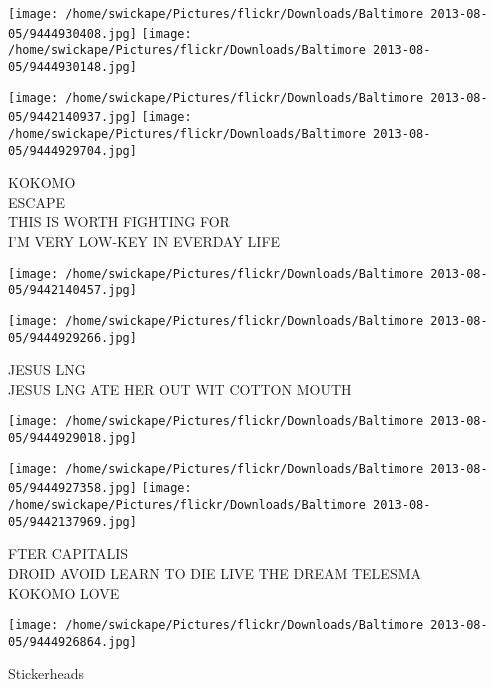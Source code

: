 \documentclass[10pt,letterpaper]{article}
\begin{document}
\texttt{[image: /home/swickape/Pictures/flickr/Downloads/Baltimore 2013-08-05/9444930408.jpg]}
\texttt{[image: /home/swickape/Pictures/flickr/Downloads/Baltimore 2013-08-05/9444930148.jpg]}

\texttt{[image: /home/swickape/Pictures/flickr/Downloads/Baltimore 2013-08-05/9442140937.jpg]}
\texttt{[image: /home/swickape/Pictures/flickr/Downloads/Baltimore 2013-08-05/9444929704.jpg]}

KOKOMO\\
ESCAPE\\
THIS IS WORTH FIGHTING FOR\\
I'M VERY LOW{-}KEY IN EVERDAY LIFE\\
\pagebreak

\texttt{[image: /home/swickape/Pictures/flickr/Downloads/Baltimore 2013-08-05/9442140457.jpg]}

\vspace{0.25in}
\texttt{[image: /home/swickape/Pictures/flickr/Downloads/Baltimore 2013-08-05/9444929266.jpg]}

JESUS LNG\\
JESUS LNG ATE HER OUT WIT COTTON MOUTH\\
\pagebreak

\texttt{[image: /home/swickape/Pictures/flickr/Downloads/Baltimore 2013-08-05/9444929018.jpg]}

\vspace{0.25in}
\texttt{[image: /home/swickape/Pictures/flickr/Downloads/Baltimore 2013-08-05/9444927358.jpg]}
\texttt{[image: /home/swickape/Pictures/flickr/Downloads/Baltimore 2013-08-05/9442137969.jpg]}

FTER CAPITALIS\\
DROID AVOID LEARN TO DIE LIVE THE DREAM TELESMA\\
KOKOMO LOVE\\
\pagebreak

\texttt{[image: /home/swickape/Pictures/flickr/Downloads/Baltimore 2013-08-05/9444926864.jpg]}

Stickerheads\\
\pagebreak
\end{document}
